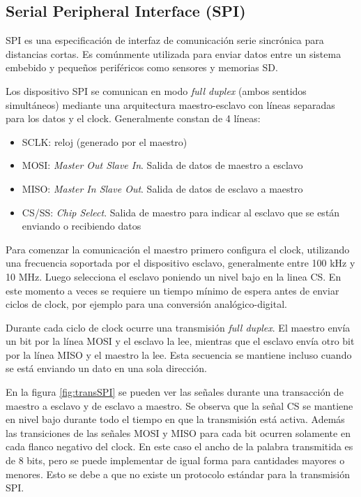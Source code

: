 \subsection{Serial Peripheral Interface (SPI)}

SPI es una especificación de interfaz de comunicación serie sincrónica para distancias cortas. Es comúnmente utilizada para enviar datos entre un sistema embebido y pequeños periféricos como sensores y memorias SD.

Los dispositivo SPI se comunican en modo \textit{full duplex} (ambos sentidos simultáneos) mediante una arquitectura maestro-esclavo con líneas separadas para los datos y el clock. Generalmente constan de 4 líneas:

\begin{itemize}
\item SCLK: reloj (generado por el maestro)
\item MOSI: \textit{Master Out Slave In}. Salida de datos de maestro a esclavo
\item MISO: \textit{Master In Slave Out}. Salida de datos de esclavo a maestro
\item CS/SS: \textit{Chip Select}. Salida de maestro para indicar al esclavo que se están enviando o recibiendo datos
\end{itemize}

Para comenzar la comunicación el maestro primero configura el clock, utilizando una frecuencia soportada por el dispositivo esclavo, generalmente entre 100 kHz y 10 MHz. Luego selecciona el esclavo poniendo un nivel bajo en la linea CS. En este momento a veces se requiere un tiempo mínimo de espera antes de enviar ciclos de clock, por ejemplo para una conversión analógico-digital.

Durante cada ciclo de clock ocurre una transmisión \textit{full duplex}. El maestro envía un bit por la línea MOSI y el esclavo la lee, mientras que el esclavo envía otro bit por la línea MISO y el maestro la lee. Esta secuencia se mantiene incluso cuando se está enviando un dato en una sola dirección.

En la figura \ref{fig:transSPI} se pueden ver las señales durante una transacción de maestro a esclavo y de esclavo a maestro. Se observa que la señal CS se mantiene en nivel bajo durante todo el tiempo en que la transmisión está activa. Además las transiciones de las señales MOSI y MISO para cada bit ocurren solamente en cada flanco negativo del clock. En este caso el ancho de la palabra transmitida es de 8 bits, pero se puede implementar de igual forma para cantidades mayores o menores. Esto se debe a que no existe un protocolo estándar para la transmisión SPI.

